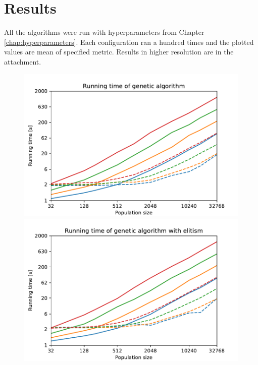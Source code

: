 \chapter{Results}
\label{chap:results}

All the algorithms were run with hyperparameters from Chapter \ref{chap:hyperparameters}. Each configuration ran a hundred times and the plotted values are mean of specified metric. Results in higher resolution are in the attachment.



\begin{figure}[ht!]
    \centering
    \begin{minipage}[t]{0.9\textwidth}
        \begin{minipage}[t]{0.48\textwidth}
            \includegraphics[width=\textwidth]{img/runs/time_ga.pdf}
        \end{minipage}
        \begin{minipage}[t]{0.48\textwidth}
            \includegraphics[width=\textwidth]{img/runs/time_ga_elitism.pdf}
        \end{minipage}
    \end{minipage}


\end{figure}
